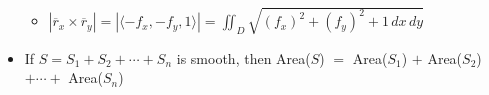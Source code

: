 \begin{itemize}
\begin{itemize}
          \item $|\overline{r}_x\times\overline{r}_y|= |\langle -f_x, -f_y, 1 \rangle|=\displaystyle\iint_D \sqrt{(f_x)^2+(f_y)^2+1\,dx\,dy}$

      \end{itemize}

    \item If $S=S_1 + S_2 + \cdots + S_n$ is smooth, then Area($S$) $=$ Area($S_1$) $+$ Area($S_2$) $+ \cdots +$ Area($S_n$)

\end{itemize}



